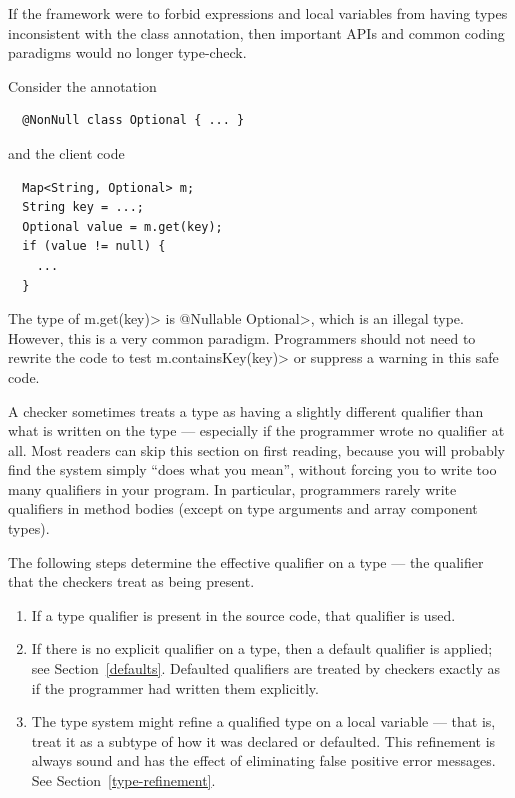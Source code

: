 If the framework were to forbid expressions and local variables from having types inconsistent with the class annotation,
then important APIs and common coding paradigms would no longer type-check.

Consider the annotation
\begin{Verbatim}
  @NonNull class Optional { ... }
\end{Verbatim}
and the client code

\begin{Verbatim}
  Map<String, Optional> m;
  String key = ...;
  Optional value = m.get(key);
  if (value != null) {
    ...
  }
\end{Verbatim}

The type of \<m.get(key)> is \<@Nullable Optional>, which is an illegal type.
However, this is a very common paradigm.  Programmers should not need to rewrite the code to test
\<m.containsKey(key)> or suppress a warning in this safe code.



A checker sometimes treats a type as having a slightly different qualifier
than what is written on the type --- especially if the programmer wrote no
qualifier at all.
Most readers can skip this section on first reading, because you will
probably find the system simply ``does what you mean'', without forcing
you to write too many qualifiers in your program.
In particular, programmers rarely write qualifiers in method bodies (except on
type arguments and array component types).

The following steps determine the effective
qualifier on a type --- the qualifier that the checkers treat as being present.

\begin{enumerate}
\item
  If a type qualifier is present in the source code, that qualifier is used.

\item
  If there is no explicit qualifier on a type, then a default
  qualifier
  is applied; see Section~\ref{defaults}. Defaulted qualifiers are treated by checkers
  exactly as if the programmer had written them explicitly.

\item
  The type system might refine a qualified type on a local variable --- that
  is, treat it as a subtype of how it was declared or defaulted.  This
  refinement is always sound and has the effect of eliminating false
  positive error messages.  See Section~\ref{type-refinement}.

\end{enumerate}

